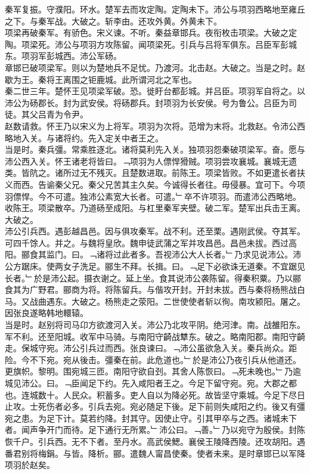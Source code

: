 \documentclass{zhvt-classic}
\begin{document}
\hspace*{2em}秦军复振。守濮阳。环水。楚军去而攻定陶。定陶未下。沛公与项羽西略地至雍丘之下。与秦军战。大破之。斩李由。还攻外黄。外黄未下。\\
\hspace*{2em}项梁再破秦军。有骄色。宋义谏。不听。秦益章邯兵。夜衔枚击项梁。大破之定陶。项梁死。沛公与项羽方攻陈留。闻项梁死。引兵与吕将军俱东。吕臣军彭城东。项羽军彭城西。沛公军砀。\\
\hspace*{2em}章邯已破项梁军。则以为楚地兵不足忧。乃渡河。北击赵。大破之。当是之时。赵歇为王。秦将王离围之钜鹿城。此所谓河北之军也。\\
\hspace*{2em}秦二世三年。楚怀王见项梁军破。恐。徙盱台都彭城。并吕臣。项羽军自将之。以沛公为砀郡长。封为武安侯。将砀郡兵。封项羽为长安侯。号为鲁公。吕臣为司徒。其父吕青为令尹。\\
\hspace*{2em}赵数请救。怀王乃以宋义为上将军。项羽为次将。范增为末将。北救赵。令沛公西略地入关。与诸将约。先入定关中者王之。\\
\hspace*{2em}当是时。秦兵彊。常乘胜逐北。诸将莫利先入关。独项羽怨秦破项梁军。奋。愿与沛公西入关。怀王诸老将皆曰。﹁项羽为人僄悍猾贼。项羽尝攻襄城。襄城无遗类。皆阬之。诸所过无不残灭。且楚数进取。前陈王。项梁皆败。不如更遣长者扶义而西。告谕秦父兄。秦父兄苦其主久矣。今诚得长者往。毋侵暴。宜可下。今项羽僄悍。今不可遣。独沛公素宽大长者。可遣。﹂卒不许项羽。而遣沛公西略地。收陈王。项梁散卒。乃道砀至成阳。与杠里秦军夹壁。破二军。楚军出兵击王离。大破之。\\
\hspace*{2em}沛公引兵西。遇彭越昌邑。因与俱攻秦军。战不利。还至栗。遇刚武侯。夺其军。可四千馀人。并之。与魏将皇欣。魏申徒武蒲之军并攻昌邑。昌邑未拔。西过高阳。郦食其监门。曰。﹁诸将过此者多。吾视沛公大人长者。﹂乃求见说沛公。沛公方踞床。使两女子洗足。郦生不拜。长揖。曰。﹁足下必欲诛无道秦。不宜踞见长者。﹂於是沛公起。摄衣谢之。延上坐。食其说沛公袭陈留。得秦积粟。乃以郦食其为广野君。郦商为将。将陈留兵。与偕攻开封。开封未拔。西与秦将杨熊战白马。又战曲遇东。大破之。杨熊走之荥阳。二世使使者斩以徇。南攻颍阳。屠之。因张良遂略韩地轘辕。\\
\hspace*{2em}当是时。赵别将司马卬方欲渡河入关。沛公乃北攻平阴。绝河津。南。战雒阳东。军不利。还至阳城。收军中马骑。与南阳守齮战犨东。破之。略南阳郡。南阳守齮走。保城守宛。沛公引兵过而西。张良谏曰。﹁沛公虽欲急入关。秦兵尚众。距险。今不下宛。宛从後击。彊秦在前。此危道也。﹂於是沛公乃夜引兵从他道还。更旗帜。黎明。围宛城三匝。南阳守欲自刭。其舍人陈恢曰。﹁死未晚也。﹂乃逾城见沛公。曰。﹁臣闻足下约。先入咸阳者王之。今足下留守宛。宛。大郡之都也。连城数十。人民众。积蓄多。吏人自以为降必死。故皆坚守乘城。今足下尽日止攻。士死伤者必多。引兵去宛。宛必随足下後。足下前则失咸阳之约。後又有彊宛之患。为足下计。莫若约降。封其守。因使止守。引其甲卒与之西。诸城未下者。闻声争开门而待。足下通行无所累。﹂沛公曰。﹁善。﹂乃以宛守为殷侯。封陈恢千户。引兵西。无不下者。至丹水。高武侯鰓。襄侯王陵降西陵。还攻胡阳。遇番君别将梅鋗。与皆。降析。郦。遣魏人甯昌使秦。使者未来。是时章邯已以军降项羽於赵矣。\\
\end{document}
